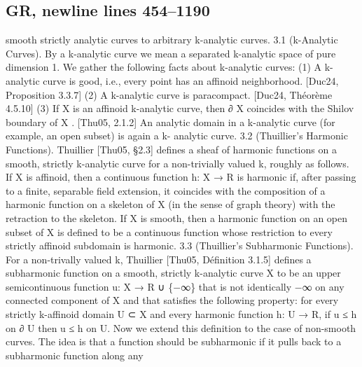 \documentclass[
  10pt,
]{article}
\newenvironment{Shaded}{}{}
\newcommand{\NormalTok}[1]{#1}
\begin{document}
\subsection{GR, newline lines 454--1190}\label{gr-newline-lines-4541190}

\begin{Shaded}
\begin{Highlighting}[]
\NormalTok{smooth strictly analytic curves to arbitrary k{-}analytic curves.}
\NormalTok{3.1 (k{-}Analytic Curves). By a k{-}analytic curve we mean a separated k{-}analytic space of}
\NormalTok{pure dimension 1. We gather the following facts about k{-}analytic curves:}
\NormalTok{   (1) A k{-}analytic curve is good, i.e., every point has an affinoid neighborhood. [Duc24,}
\NormalTok{        Proposition 3.3.7]}
\NormalTok{   (2) A k{-}analytic curve is paracompact. [Duc24, Théorème 4.5.10]}
\NormalTok{   (3) If X is an affinoid k{-}analytic curve, then ∂ X coincides with the Shilov boundary}
\NormalTok{        of X . [Thu05, 2.1.2]}
\NormalTok{An analytic domain in a k{-}analytic curve (for example, an open subset) is again a k{-}}
\NormalTok{analytic curve.}
\NormalTok{3.2 (Thuillier’s Harmonic Functions). Thuillier [Thu05, §2.3] defines a sheaf of harmonic}
\NormalTok{functions on a smooth, strictly k{-}analytic curve for a non{-}trivially valued k, roughly as}
\NormalTok{follows. If X is affinoid, then a continuous function h: X → R is harmonic if, after passing}
\NormalTok{to a finite, separable field extension, it coincides with the composition of a harmonic}
\NormalTok{function on a skeleton of X (in the sense of graph theory) with the retraction to the}
\NormalTok{skeleton. If X is smooth, then a harmonic function on an open subset of X is defined to be}
\NormalTok{a continuous function whose restriction to every strictly affinoid subdomain is harmonic.}
\NormalTok{3.3 (Thuillier’s Subharmonic Functions). For a non{-}trivally valued k, Thuillier [Thu05,}
\NormalTok{Définition 3.1.5] defines a subharmonic function on a smooth, strictly k{-}analytic curve X}
\NormalTok{to be an upper semicontinuous function u: X → R ∪ \{−∞\} that is not identically −∞}
\NormalTok{on any connected component of X and that satisfies the following property: for every}
\NormalTok{strictly k{-}affinoid domain U ⊂ X and every harmonic function h: U → R, if u ≤ h on ∂ U}
\NormalTok{then u ≤ h on U.}
\NormalTok{  Now we extend this definition to the case of non{-}smooth curves. The idea is that a}
\NormalTok{function should be subharmonic if it pulls back to a subharmonic function along any}

\end{Highlighting}
\end{Shaded}
\end{document}
